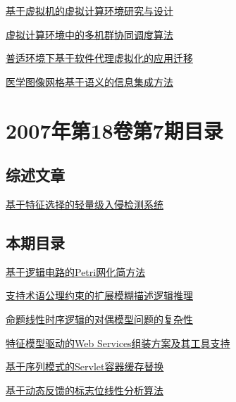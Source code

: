 \documentclass[a4paper]{article}
\begin{document}
\href{http://www.jos.org.cn/ch/reader/download_pdf.aspx?file_no=20070814&year_id=2007&quarter_id=8&falg=1}{基于虚拟机的虚拟计算环境研究与设计}

\href{http://www.jos.org.cn/ch/reader/download_pdf.aspx?file_no=20070815&year_id=2007&quarter_id=8&falg=1}{虚拟计算环境中的多机群协同调度算法}

\href{http://www.jos.org.cn/ch/reader/download_pdf.aspx?file_no=20070816&year_id=2007&quarter_id=8&falg=1}{普适环境下基于软件代理虚拟化的应用迁移}

\href{http://www.jos.org.cn/ch/reader/download_pdf.aspx?file_no=20070817&year_id=2007&quarter_id=8&falg=1}{医学图像网格基于语义的信息集成方法}


\section{\textbf{2007年第18卷第7期目录}}
\subsection{综述文章}
\href{http://www.jos.org.cn/ch/reader/download_pdf.aspx?file_no=20070709&year_id=2007&quarter_id=7&falg=1}{基于特征选择的轻量级入侵检测系统}

\subsection{本期目录}
\href{http://www.jos.org.cn/ch/reader/download_pdf.aspx?file_no=20070701&year_id=2007&quarter_id=7&falg=1}{基于逻辑电路的Petri网化简方法}

\href{http://www.jos.org.cn/ch/reader/download_pdf.aspx?file_no=20070702&year_id=2007&quarter_id=7&falg=1}{支持术语公理约束的扩展模糊描述逻辑推理}

\href{http://www.jos.org.cn/ch/reader/download_pdf.aspx?file_no=20070703&year_id=2007&quarter_id=7&falg=1}{命题线性时序逻辑的对偶模型问题的复杂性}

\href{http://www.jos.org.cn/ch/reader/download_pdf.aspx?file_no=20070704&year_id=2007&quarter_id=7&falg=1}{特征模型驱动的Web Services组装方案及其工具支持}

\href{http://www.jos.org.cn/ch/reader/download_pdf.aspx?file_no=20070705&year_id=2007&quarter_id=7&falg=1}{基于序列模式的Servlet容器缓存替换}

\href{http://www.jos.org.cn/ch/reader/download_pdf.aspx?file_no=20070706&year_id=2007&quarter_id=7&falg=1}{基于动态反馈的标志位线性分析算法}
\end{document}
